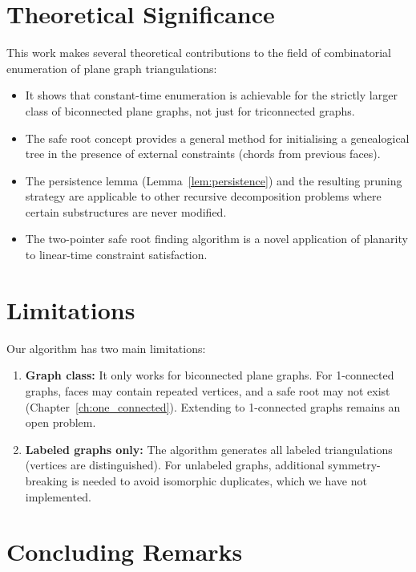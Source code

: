 \section{Theoretical Significance}
\label{sec:significance}

This work makes several theoretical contributions to the field of combinatorial enumeration of plane graph triangulations:

\begin{itemize}
    \item It shows that constant-time enumeration is achievable for the strictly larger class of biconnected plane graphs, not just for triconnected graphs.
    \item The safe root concept provides a general method for initialising a genealogical tree in the presence of external constraints (chords from previous faces).
    \item The persistence lemma (Lemma~\ref{lem:persistence}) and the resulting pruning strategy are applicable to other recursive decomposition problems where certain substructures are never modified.
    \item The two-pointer safe root finding algorithm is a novel application of planarity to linear-time constraint satisfaction.
\end{itemize}

\section{Limitations}
\label{sec:limitations_conclusion}

Our algorithm has two main limitations:

\begin{enumerate}
    \item \textbf{Graph class:} It only works for biconnected plane graphs. 
    For 1-connected graphs, faces may contain repeated vertices, and a safe root may not exist (Chapter~\ref{ch:one_connected}). 
    Extending to 1-connected graphs remains an open problem.
    
    \item \textbf{Labeled graphs only:} The algorithm generates all labeled triangulations (vertices are distinguished). 
    For unlabeled graphs, additional symmetry-breaking is needed to avoid isomorphic duplicates, which we have not implemented.
\end{enumerate}

\section{Concluding Remarks}
\label{sec:concluding_remarks}

